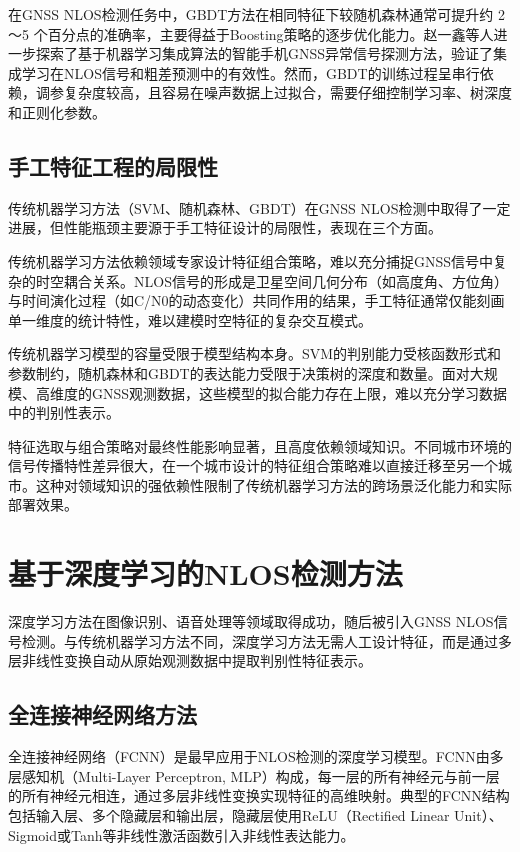     在GNSS NLOS检测任务中，GBDT方法在相同特征下较随机森林通常可提升约 2～5 个百分点的准确率，主要得益于Boosting策略的逐步优化能力。赵一鑫等人\cite{zhao2025ensemble}进一步探索了基于机器学习集成算法的智能手机GNSS异常信号探测方法，验证了集成学习在NLOS信号和粗差预测中的有效性。然而，GBDT的训练过程呈串行依赖，调参复杂度较高，且容易在噪声数据上过拟合，需要仔细控制学习率、树深度和正则化参数。

\subsection{手工特征工程的局限性}

    传统机器学习方法（SVM、随机森林、GBDT）在GNSS NLOS检测中取得了一定进展，但性能瓶颈主要源于手工特征设计的局限性，表现在三个方面。

    传统机器学习方法依赖领域专家设计特征组合策略，难以充分捕捉GNSS信号中复杂的时空耦合关系。NLOS信号的形成是卫星空间几何分布（如高度角、方位角）与时间演化过程（如C/N0的动态变化）共同作用的结果，手工特征通常仅能刻画单一维度的统计特性，难以建模时空特征的复杂交互模式。

    传统机器学习模型的容量受限于模型结构本身。SVM的判别能力受核函数形式和参数制约，随机森林和GBDT的表达能力受限于决策树的深度和数量。面对大规模、高维度的GNSS观测数据，这些模型的拟合能力存在上限，难以充分学习数据中的判别性表示。

    特征选取与组合策略对最终性能影响显著，且高度依赖领域知识。不同城市环境的信号传播特性差异很大，在一个城市设计的特征组合策略难以直接迁移至另一个城市。这种对领域知识的强依赖性限制了传统机器学习方法的跨场景泛化能力和实际部署效果。

\section{基于深度学习的NLOS检测方法}

    深度学习方法在图像识别、语音处理等领域取得成功，随后被引入GNSS NLOS信号检测。与传统机器学习方法不同，深度学习方法无需人工设计特征，而是通过多层非线性变换自动从原始观测数据中提取判别性特征表示。

\subsection{全连接神经网络方法}

    全连接神经网络（FCNN）是最早应用于NLOS检测的深度学习模型。FCNN由多层感知机（Multi-Layer Perceptron, MLP）构成，每一层的所有神经元与前一层的所有神经元相连，通过多层非线性变换实现特征的高维映射。典型的FCNN结构包括输入层、多个隐藏层和输出层，隐藏层使用ReLU（Rectified Linear Unit）、Sigmoid或Tanh等非线性激活函数引入非线性表达能力。

